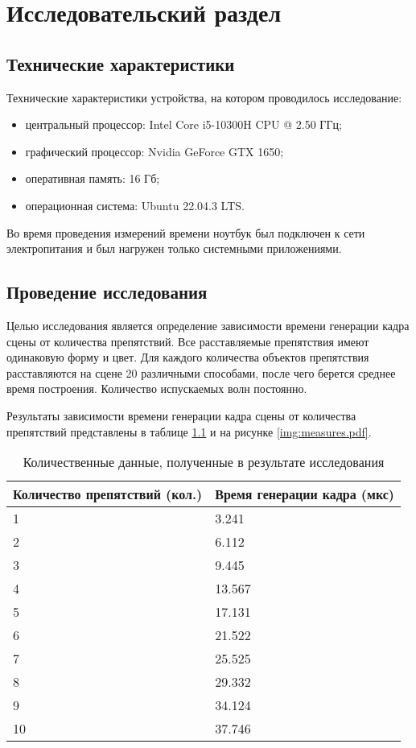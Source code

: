 \chapter{Исследовательский раздел}

\section{Технические характеристики}

Технические характеристики устройства, на котором проводилось исследование:
\begin{itemize}
	\item центральный процессор: Intel Core i5-10300H CPU @ 2.50 ГГц;
	\item графический процессор: Nvidia GeForce GTX 1650;
	\item оперативная память: 16 Гб;
	\item операционная система: Ubuntu 22.04.3 LTS.
\end{itemize}

Во время проведения измерений времени ноутбук был подключен к сети электропитания и был нагружен только системными приложениями.

\section{Проведение исследования}

Целью исследования является определение зависимости времени генерации кадра сцены от количества препятствий.
Все расставляемые препятствия имеют одинаковую форму и цвет.
Для каждого количества объектов препятствия расставляются на сцене 20 различными способами, после чего берется среднее время построения.
Количество испускаемых волн постоянно.

Результаты зависимости времени генерации кадра сцены от количества препятствий представлены в таблице \ref{table:measures} и на рисунке \ref{img:measures.pdf}.
\begin{table}[h!]
	\begin{center}
		\caption{\label{table:measures} Количественные данные, полученные в результате исследования}
		\begin{tabular}{|p{225pt}|p{225pt}|}
			\hline
			Количество препятствий (кол.) & Время генерации кадра (мкс) \\ \hline
			1 & 3.241 \\ \hline
			2 & 6.112 \\ \hline
			3 & 9.445 \\ \hline
			4 & 13.567 \\ \hline
			5 & 17.131 \\ \hline
			6 & 21.522 \\ \hline
			7 & 25.525 \\ \hline
			8 & 29.332 \\ \hline
			9 & 34.124 \\ \hline
			10 & 37.746 \\ \hline
		\end{tabular}
	\end{center}
\end{table}

